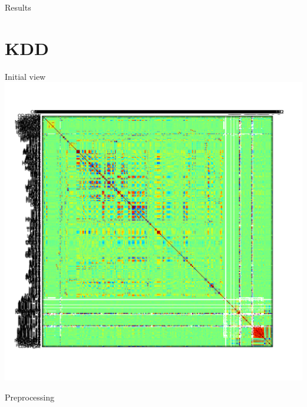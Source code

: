 \documentclass[12pt]{beamer}
\begin{document}
\begin{frame}{Results}
\end{frame}

\section{KDD}
\begin{frame}{Initial view}
\includegraphics[height=\textheight,width=\textwidth,keepaspectratio]{plots/kdd_orig.png}
\end{frame}

\begin{frame}{Preprocessing}

\end{frame}
\end{document}
